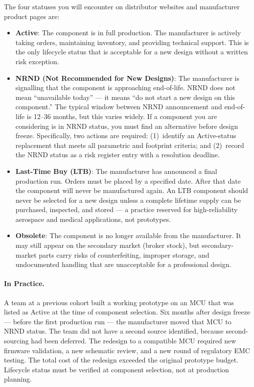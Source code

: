 The four statuses you will encounter on distributor websites and manufacturer product pages are:

\begin{itemize}
  \item \textbf{Active}: The component is in full production.
        The manufacturer is actively taking orders, maintaining inventory, and providing technical support.
        This is the only lifecycle status that is acceptable for a new design without a written risk exception.

  \item \textbf{NRND (Not Recommended for New Designs)}: The manufacturer is signalling that the component is approaching end-of-life.
        NRND does not mean ``unavailable today'' --- it means ``do not start a new design on this component.''
        The typical window between NRND announcement and end-of-life is 12--36 months, but this varies widely.
        If a component you are considering is in NRND status, you must find an alternative before design freeze.
        Specifically, two actions are required: (1)~identify an Active-status replacement that meets all parametric and footprint criteria; and (2)~record the NRND status as a risk register entry with a resolution deadline.

  \item \textbf{Last-Time Buy (LTB)}: The manufacturer has announced a final production run.
        Orders must be placed by a specified date.
        After that date the component will never be manufactured again.
        An LTB component should never be selected for a new design unless a complete lifetime supply can be purchased, inspected, and stored --- a practice reserved for high-reliability aerospace and medical applications, not prototypes.

  \item \textbf{Obsolete}: The component is no longer available from the manufacturer.
        It may still appear on the secondary market (broker stock), but secondary-market parts carry risks of counterfeiting, improper storage, and undocumented handling that are unacceptable for a professional design.
\end{itemize}

\paragraph{In Practice.}
A team at a previous cohort built a working prototype on an MCU that was listed as Active at the time of component selection.
Six months after design freeze --- before the first production run --- the manufacturer moved that MCU to NRND status.
The team did not have a second source identified, because second-sourcing had been deferred.
The redesign to a compatible MCU required new firmware validation, a new schematic review, and a new round of regulatory EMC testing.
The total cost of the redesign exceeded the original prototype budget.
Lifecycle status must be verified at component selection, not at production planning.

